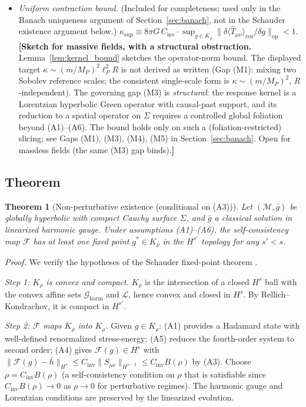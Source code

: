 \documentclass[12pt,a4paper]{article}
\newtheorem{theorem}{Theorem}
\begin{document}
\begin{itemize}
\item[\textbf{(A6)}] \textit{Uniform contraction bound.}
(Included for completeness; used only in the Banach uniqueness argument of Section~\ref{sec:banach}, not in the Schauder existence argument below.)\newline
$\kappa_{\sup} \equiv 8\pi G\,C_{\text{inv}}\cdot\sup_{g\in K_\rho}\|\delta\langle\hat{T}_{\mu\nu}\rangle_{\text{ren}}/\delta g\|_{\text{op}} < 1$.
\textbf{[Sketch for massive fields, with a structural obstruction.}
Lemma~\ref{lem:kernel_bound} sketches the operator-norm bound. The displayed target
$\kappa \sim (m/M_P)^2\ell_P^2 R$ is not derived as written (Gap (M1): mixing two Sobolev
reference scales; the consistent single-scale form is $\kappa\sim(m/M_P)^2$, $R$-independent).
The governing gap (M3) is \emph{structural}: the response kernel is a Lorentzian hyperbolic
Green operator with causal-past support, and its reduction to a spatial operator on
$\Sigma$ requires a controlled global foliation beyond (A1)--(A6). The bound holds only on
such a (foliation-restricted) slicing; see Gaps (M1), (M3), (M4), (M5) in
Section~\ref{sec:banach}. Open for massless fields (the same (M3) gap binds).\textbf{]}
\end{itemize}

\subsection{Theorem}

\begin{theorem}[Non-perturbative existence (conditional on (A3))]
\label{thm:schauder}
Let $(\mathcal{M},\bar{g})$ be globally hyperbolic with compact Cauchy surface $\Sigma$,
and $\bar{g}$ a classical solution in linearized harmonic gauge. Under assumptions
\emph{(A1)--(A6)}, the self-consistency map $\mathcal{F}$ has at least one fixed point
$g^* \in K_\rho$ in the $H^{s'}$ topology for any $s' < s$.
\end{theorem}

\noindent\emph{Proof.} We verify the hypotheses of the Schauder fixed-point theorem
\cite{schauder}.

\smallskip\noindent\textit{Step 1: $K_\rho$ is convex and compact.} $K_\rho$ is the
intersection of a closed $H^s$ ball with the convex affine sets $\mathcal{G}_{\text{harm}}$
and $\mathcal{L}$, hence convex and closed in $H^s$. By Rellich--Kondrachov, it is compact
in $H^{s'}$.

\smallskip\noindent\textit{Step 2: $\mathcal{F}$ maps $K_\rho$ into $K_\rho$.} Given
$g\in K_\rho$: (A1) provides a Hadamard state with well-defined renormalized
stress-energy; (A5) reduces the fourth-order system to second order; (A4) gives
$\mathcal{F}(g) \in H^s$ with $\|\mathcal{F}(g)-\bar{h}\|_{H^s} \leq
C_{\text{inv}}\|S_{\mu\nu}\|_{H^{s-2}} \leq C_{\text{inv}}B(\rho)$ by (A3). Choose
$\rho = C_{\text{inv}}B(\rho)$ (a self-consistency condition on $\rho$ that is satisfiable
since $C_{\text{inv}}B(\rho)\to 0$ as $\rho\to 0$ for perturbative regimes). The harmonic
gauge and Lorentzian conditions are preserved by the linearized evolution.
\end{document}
